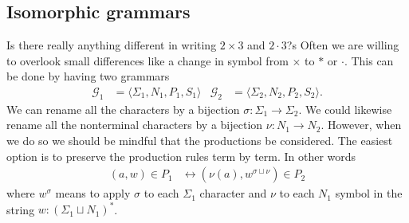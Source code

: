 \subsection{Isomorphic grammars}
Is there really anything different in writing $2\times 3$ and $2\cdot 3$?s
Often we are willing to overlook small differences like a change in symbol from 
$\times$ to $*$ or $\cdot$.  This can be done by having two grammars 
\begin{align*}
    \mathcal{G}_1 & = \langle \Sigma_1,N_1,P_1,S_1\rangle
    &
    \mathcal{G}_2 & = \langle \Sigma_2,N_2,P_2,S_2\rangle.
\end{align*}
We can rename all the characters by a bijection $\sigma:\Sigma_1\to \Sigma_2$.
We could likewise rename all the nonterminal characters by a bijection 
$\nu:N_1\to N_2$.  However, when we do so we should be mindful that the productions 
be considered.  The easiest option is to preserve the production rules term by term.
In other words
\begin{align*}
    (a,w)\in P_1 & \leftrightarrow (\nu(a),w^{\sigma\sqcup \nu})\in P_2
\end{align*}
where $w^{\sigma}$ means to apply $\sigma$ to each $\Sigma_1$ character 
and $\nu$ to each $N_1$ symbol in the string $w:(\Sigma_1\sqcup N_1)^*$.